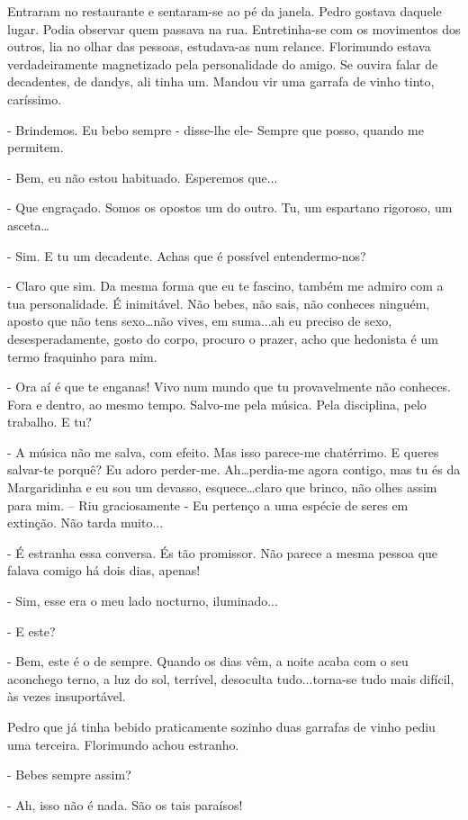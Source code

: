 Entraram no restaurante e sentaram-se ao pé da janela. Pedro gostava
daquele lugar. Podia observar quem passava na rua. Entretinha-se com os
movimentos dos outros, lia no olhar das pessoas, estudava-as num
relance. Florimundo estava verdadeiramente magnetizado pela
personalidade do amigo. Se ouvira falar de decadentes, de dandys, ali
tinha um. Mandou vir uma garrafa de vinho tinto, caríssimo.

- Brindemos. Eu bebo sempre - disse-lhe ele- Sempre que posso, quando me
permitem.

- Bem, eu não estou habituado. Esperemos que...

- Que engraçado. Somos os opostos um do outro. Tu, um espartano
rigoroso, um asceta\ldots{}

- Sim. E tu um decadente. Achas que é possível entendermo-nos?

- Claro que sim. Da mesma forma que eu te fascino, também me admiro com
a tua personalidade. É inimitável. Não bebes, não sais, não conheces
ninguém, aposto que não tens sexo\ldots{}não vives, em suma...ah eu
preciso de sexo, desesperadamente, gosto do corpo, procuro o prazer,
acho que hedonista é um termo fraquinho para mim.

- Ora aí é que te enganas! Vivo num mundo que tu provavelmente não
conheces. Fora e dentro, ao mesmo tempo. Salvo-me pela música. Pela
disciplina, pelo trabalho. E tu?

- A música não me salva, com efeito. Mas isso parece-me chatérrimo. E
queres salvar-te porquê? Eu adoro perder-me. Ah\ldots{}perdia-me agora
contigo, mas tu és da Margaridinha e eu sou um devasso,
esquece\ldots{}claro que brinco, não olhes assim para mim. -- Riu
graciosamente - Eu pertenço a uma espécie de seres em extinção. Não
tarda muito...

- É estranha essa conversa. És tão promissor. Não parece a mesma pessoa
que falava comigo há dois dias, apenas!

- Sim, esse era o meu lado nocturno, iluminado...

- E este?

- Bem, este é o de sempre. Quando os dias vêm, a noite acaba com o seu
aconchego terno, a luz do sol, terrível, desoculta tudo...torna-se tudo
mais difícil, às vezes insuportável.

Pedro que já tinha bebido praticamente sozinho duas garrafas de vinho
pediu uma terceira. Florimundo achou estranho.

- Bebes sempre assim?

- Ah, isso não é nada. São os tais paraísos!

